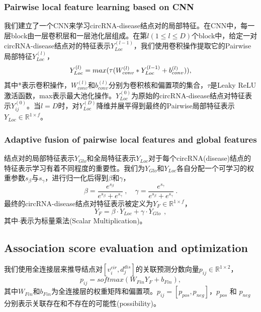 \documentclass{bioinfo}
\begin{document}
\begin{methods}
\vspace{-0.3cm}

\subsubsection{Pairwise local feature learning based on CNN}
我们建立了一个CNN来学习circRNA-disease结点对的局部特征。在CNN中，每一层block由一层卷积层和一层池化层组成。在第$l(1\leqslant l\leqslant D)$个block中，给定一对circRNA-disease结点对的特征表示${Y}_{Loc}^{(l - 1)}$，我们使用卷积操作提取它的Pairwise局部特征${Y}_{Loc}^{(l)}$，
\begin{equation}
{Y}_{Loc}^{(l)} = max(\mathop{\rm{\tau}}({W_{conv}^{(l)}} * {Y}_{Loc}^{(l - 1)} + {b_{conv}^{(l)}})),
\end{equation}
其中*表示卷积操作，$W_{conv}^{(l)}$和$b_{conv}^{(l)}$分别为卷积核和偏置项的集合，$\tau$是Leaky ReLU激活函数，max表示最大池化操作。$Y_{Loc}^{(0)}$为原始的circRNA-disease结点对特征表示$Y_{ij}^{(0)}$。当$l = D$时，对$Y_{Loc}^{(D)}$降维并展平得到最终的Pairwise局部特征表示$Y_{Loc}\in \mathbb{R}^{1\times f}$。
\vspace{-0.4cm}

\subsubsection{Adaptive fusion of pairwise local features and global features}
结点对的局部特征表示${Y_{Glo}}$和全局特征表示${Y_{Loc}}$对于每个circRNA(disease)结点的特征表示学习有着不同程度的重要性。我们为${Y_{Glo}}$和${Y_{Loc}}$各自分配一个可学习的权重参数$s_{\beta}$与$s_{\gamma}$，进行归一化后得到$\beta$和$\gamma$，
\begin{equation}
	\beta = \frac{e^{s_{\beta}}}{e^{s_{\beta}} + e^{s_{\gamma}}}\ , \quad \gamma = \frac{e^{s_{\gamma}}}{e^{s_{\beta}} + e^{s_{\gamma}}}\ .
	\end{equation}
最终的circRNA-disease结点对特征表示被定义为${Y}_{F} \in \mathbb{R}^{1\times f}$，
\begin{equation}
	{Y}_{F} = \beta \cdot {Y_{Loc}} + \gamma \cdot {Y_{Glo}}\ \ ,
\end{equation}
其中$\cdot$表示为标量乘法(Scalar Multiplication)。


\subsection{Association score evaluation and optimization}
我们使用全连接层来推导结点对$[v_i^{cir},d_j^{dis}]$的关联预测分数向量$p_{ij} \in \mathbb{R}^{1\times 2}$，
\begin{equation}
	p_{ij} = softmax(W_{Fin}Y_{F} + b_{Fin}),
\end{equation}
其中$W_{Fin}$和$b_{Fin}$为全连接层的权重矩阵和偏置项。$p_{ij} = [p_{pos}, p_{neg}]$，$p_{pos}$ 和 $p_{neg}$ 分别表示关联存在和不存在的可能性(possibility)。


\end{methods}
\end{document}
